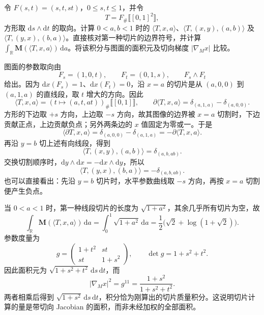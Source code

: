 \begin{exercise}\label{g3:ex:graph-current-slice-signs}
	令 \(F(s,t)=(s,t,st)\)，\(0\le s,t\le1\)，并令
	\[
		T=F_\#\lBrack[0,1]^2\rBrack,
	\]
	方形取 \(\mathrm ds\wedge\mathrm dt\) 的取向。计算 \(0<a,b<1\) 时的 \(\langle T,x,a\rangle\)、\(\langle T,(x,y),(a,b)\rangle\) 及 \(\langle T,(y,x),(b,a)\rangle\)。直接核对第一种切片的边界符号，并计算 \(\int_{\mathbb R}\mathbf M(\langle T,x,a\rangle)\,\mathrm da\)。将该积分与图面的面积元及切向梯度 \(|\nabla_Mx|\) 比较。
\end{exercise}
\begin{solution}
	图面的参数取向由
	\[
		F_s=(1,0,t),\qquad F_t=(0,1,s),\qquad
		F_s\wedge F_t
	\]
	给出。因为 \(\mathrm dx(F_s)=1\)、\(\mathrm dx(F_t)=0\)，沿 \(x=a\) 的切片是从 \((a,0,0)\) 到 \((a,1,a)\) 的直线段，取 \(t\) 增大的方向。因此
	\[
		\langle T,x,a\rangle=(t\mapsto(a,t,at))_\#\lBrack[0,1]\rBrack,
		\qquad
		\partial\langle T,x,a\rangle=\delta_{(a,1,a)}-\delta_{(a,0,0)}.
	\]
	方形的下边取 \(+s\) 方向，上边取 \(-s\) 方向，故其图像的边界被 \(x=a\) 切割时，下边贡献正点，上边贡献负点；另外两条边的 \(x\) 值固定为零或一。于是
	\[
		\langle\partial T,x,a\rangle
		=\delta_{(a,0,0)}-\delta_{(a,1,a)}
		=-\partial\langle T,x,a\rangle.
	\]
	再沿 \(y=b\) 切上述有向线段，得到
	\[
		\langle T,(x,y),(a,b)\rangle=\delta_{(a,b,ab)}.
	\]
	交换切割顺序时，\(\mathrm dy\wedge\mathrm dx=-\mathrm dx\wedge\mathrm dy\)，所以
	\[
		\langle T,(y,x),(b,a)\rangle=-\delta_{(a,b,ab)}.
	\]
	也可以直接看出：先沿 \(y=b\) 切片时，水平参数曲线取 \(-s\) 方向，再按 \(x=a\) 切割便产生负点。

	当 \(0<a<1\) 时，第一种线段切片的长度为 \(\sqrt{1+a^2}\)，其余几乎所有切片为空，故
	\[
		\int_{\mathbb R}\mathbf M(\langle T,x,a\rangle)\,\mathrm da
		=\int_0^1\sqrt{1+a^2}\,\mathrm da
		=\frac12\bigl(\sqrt2+\log(1+\sqrt2)\bigr).
	\]
	参数度量为
	\[
		g=\begin{pmatrix}1+t^2&st\\st&1+s^2\end{pmatrix},\qquad
		\det g=1+s^2+t^2.
	\]
	因此面积元为 \(\sqrt{1+s^2+t^2}\,\mathrm ds\,\mathrm dt\)，而
	\[
		|\nabla_Mx|^2=g^{11}=\frac{1+s^2}{1+s^2+t^2}.
	\]
	两者相乘后得到 \(\sqrt{1+s^2}\,\mathrm ds\,\mathrm dt\)，积分恰为刚算出的切片质量积分。这说明切片计算的量是带切向 Jacobian 的面积，而非未经加权的全部面积。
\end{solution}


